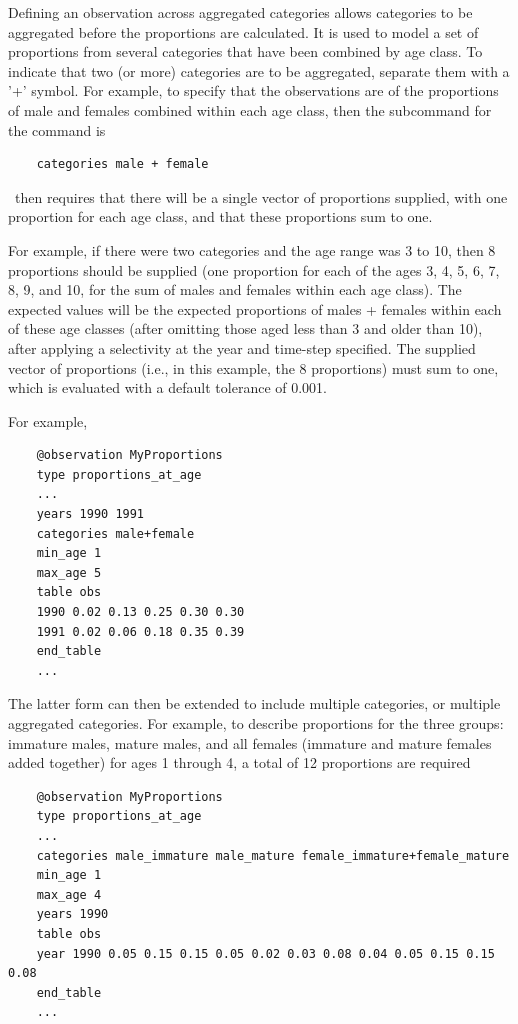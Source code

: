 Defining an observation across aggregated categories allows categories to be aggregated before the proportions are calculated. It is used to model a set of proportions from several categories that have been combined by age class. To indicate that two (or more) categories are to be aggregated, separate them with a '+' symbol. For example, to specify that the observations are of the proportions of male and females combined within each age class, then the subcommand  for the  command is

{\small{\begin{verbatim}
	categories male + female
\end{verbatim}}}

\CNAME\ then requires that there will be a single vector of proportions supplied, with one proportion for each age class, and that these proportions sum to one.

For example, if there were two categories and the age range was 3 to 10, then 8 proportions should be supplied (one proportion for each of the ages 3, 4, 5, 6, 7, 8, 9, and 10, for the sum of males and females within each age class). The expected values will be the expected proportions of males + females within each of these age classes (after omitting those aged less than 3 and older than 10), after applying a selectivity at the year and time-step specified. The supplied vector of proportions (i.e., in this example, the 8 proportions) must sum to one, which is evaluated with a default tolerance of 0.001.

For example,

{\small{\begin{verbatim}
	@observation MyProportions
	type proportions_at_age
	...
	years 1990 1991
	categories male+female
	min_age 1
	max_age 5
	table obs
	1990 0.02 0.13 0.25 0.30 0.30
	1991 0.02 0.06 0.18 0.35 0.39
	end_table
	...
\end{verbatim}}}

The latter form can then be extended to include multiple categories, or multiple aggregated categories. For example, to describe proportions for the three groups: immature males, mature males, and all females (immature and mature females added together) for ages 1 through 4, a total of 12 proportions are required

{\small{\begin{verbatim}
	@observation MyProportions
	type proportions_at_age
	...
	categories male_immature male_mature female_immature+female_mature
	min_age 1
	max_age 4
	years 1990
	table obs
	year 1990 0.05 0.15 0.15 0.05 0.02 0.03 0.08 0.04 0.05 0.15 0.15 0.08
	end_table
	...
\end{verbatim}}}

